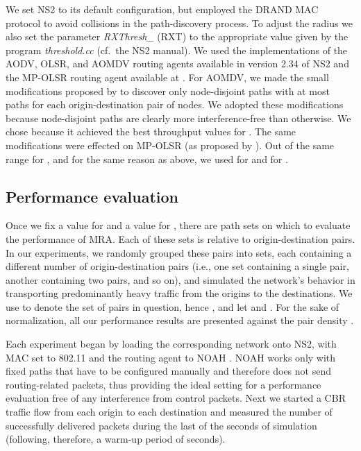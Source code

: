\documentclass{article}
\begin{document}
We set NS2 to its default configuration, but employed the DRAND MAC protocol
\cite{Rhee2006} to avoid collisions in the path-discovery process. To adjust the
radius  we also set the parameter \emph{RXThresh\_} (RXT) to the appropriate
value given by the program \emph{threshold.cc} (cf.\ the NS2 manual). We used
the implementations of the AODV, OLSR, and AOMDV routing agents available in
version 2.34 of NS2 and the MP-OLSR routing agent available at \cite{mpolsr}.
For AOMDV, we made the small modifications proposed by \cite{YuHua2005} to
discover only node-disjoint paths with at most  paths for each
origin-destination pair of nodes. We adopted these modifications because
node-disjoint paths are clearly more interference-free than otherwise. We chose
 because it achieved the best throughput values for . The same
modifications were effected on MP-OLSR (as proposed by \cite{Xun2005}). Out of
the same range for , and for the same reason as above, we used  for
 and  for .

\subsection{Performance evaluation}

Once we fix a value for  and a value for , there are  path sets
on which to evaluate the performance of MRA. Each of these sets is relative to
 origin-destination pairs. In our experiments, we randomly grouped these
pairs into  sets, each containing a different number of origin-destination
pairs (i.e., one set containing a single pair, another containing two pairs, and
so on), and simulated the network's behavior in transporting predominantly heavy
traffic from the origins to the destinations. We use  to denote the set of
pairs in question, hence , and let
 and
. For the
sake of normalization, all our performance results are presented against the
pair density . 

Each experiment began by loading the corresponding network onto NS2, with MAC
set to 802.11 and the routing agent to NOAH \cite{noah}. NOAH works only with
fixed paths that have to be configured manually and therefore does not send
routing-related packets, thus providing the ideal setting for a performance
evaluation free of any interference from control packets. Next we started a CBR
traffic flow from each origin to each destination and measured the number of
successfully delivered packets during the last  of the  seconds of
simulation (following, therefore, a warm-up period of  seconds).
\end{document}
